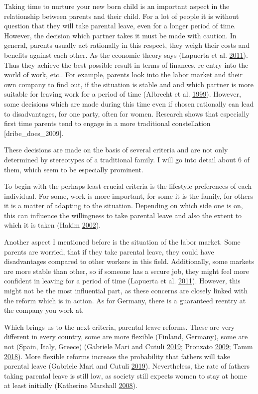 \documentclass[
  12pt,
]{article}
\begin{document}
Taking time to nurture your new born child is an important aspect in the relationship between parents and their child. For a lot of people it is without question that they will take parental leave, even for a longer period of time.
However, the decision which partner takes it must be made with caution. In general, parents usually act rationally in this respect, they weigh their costs and benefits against each other. As the economic theory says (Lapuerta et al. \protect\hyperlink{ref-lapuerta_individual_2011}{2011}). Thus they achieve the best possible result in terms of finances, re-entry into the world of work, etc..
For example, parents look into the labor market and their own company to find out, if the situation is stable and and which partner is more suitable for leaving work for a period of time (Albrecht et al. \protect\hyperlink{ref-albrecht_career_1999}{1999}). However, some decisions which are made during this time even if chosen rationally can lead to disadvantages, for one party, often for women. Research shows that especially first time parents tend to engage in a more traditional constellation {[}dribe\_does\_2009{]}.

These decisions are made on the basis of several criteria and are not only determined by stereotypes of a traditional family. I will go into detail about 6 of them, which seem to be especially prominent.

To begin with the perhaps least crucial criteria is the lifestyle preferences of each individual. For some, work is more important, for some it is the family, for others it is a matter of adapting to the situation. Depending on which side one is on, this can influence the willingness to take parental leave and also the extent to which it is taken (Hakim \protect\hyperlink{ref-hakim_lifestyle_2002}{2002}).

Another aspect I mentioned before is the situation of the labor market. Some parents are worried, that if they take parental leave, they could have disadvantages compared to other workers in this field. Additionally, some markets are more stable than other, so if someone has a secure job, they might feel more confident in leaving for a period of time (Lapuerta et al. \protect\hyperlink{ref-lapuerta_individual_2011}{2011}).
However, this might not be the most influential part, as these concerns are closely linked with the reform which is in action. As for Germany, there is a guaranteed reentry at the company you work at.

Which brings us to the next criteria, parental leave reforms. These are very different in every country, some are more flexible (Finland, Germany), some are not (Spain, Italy, Greece) (Gabriele Mari and Cutuli \protect\hyperlink{ref-gabriele_mari_parental_2019}{2019}; Pronzato \protect\hyperlink{ref-pronzato_return_2009}{2009}; Tamm \protect\hyperlink{ref-tamm_fathers_2018}{2018}). More flexible reforms increase the probability that fathers will take parental leave (Gabriele Mari and Cutuli \protect\hyperlink{ref-gabriele_mari_parental_2019}{2019}).
Nevertheless, the rate of fathers taking parental leave is still low, as society still expects women to stay at home at least initially (Katherine Marshall \protect\hyperlink{ref-katherine_marshall_fathers_2008}{2008}).
\end{document}
